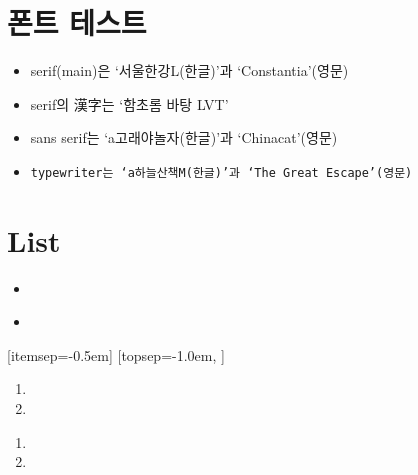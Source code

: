 \documentclass[12pt,a4paper,oneside]{book}
\begin{document}
				
\newpage
\chapter{폰트 테스트}

		\begin{itemize}
		\item \textrm{\huge serif(main)은 `서울한강L(한글)'과 `Constantia'(영문)}
		\item \textrm{\huge serif의 漢字는 `함초롬 바탕 LVT'}
		\item \textsf{\huge sans serif는 `a고래야놀자(한글)'과 `Chinacat'(영문)}
		\item \texttt{\huge typewriter는 `a하늘산책M(한글)'과 `The Great Escape'(영문)}
		\end{itemize}

\newpage
\chapter{List}
\newpage  \null


			\begin{itemize}[itemsep=0.0em]
			\item	
			\end{itemize}
			
			\begin{itemize}[topsep=0.0em,itemsep=0.0em]
			\item	
			\end{itemize}	


			[itemsep=-0.5em]
			[topsep=-1.0em,			]
			
		\begin{enumerate}[itemsep=0.0em]
		\item	
		\item	
		\end{enumerate}
		
		\begin{enumerate}[ topsep=0.0em, itemsep=-0.5em ]
		\item	
		\item	
		\end{enumerate}
		
\end{document}
